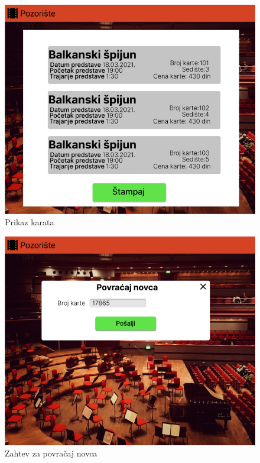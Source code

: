 \documentclass[a4paper]{article}
\begin{document}
\begin{figure}[H]
  \begin{center}
    \includegraphics[width=130mm]{../images/blagajnik_stampanje_karata.png}
  \end{center}
  \caption{Prikaz karata}
  \label{blagajnik_stampanje_karata}
\end{figure}

\begin{figure}[H]
  \begin{center}
    \includegraphics[width=130mm]{../images/blagajnik_povracaj_novca.png}
  \end{center}
  \caption{Zahtev za povračaj novca}
  \label{blagajnik_povracaj_novca}
\end{figure}
\end{document}
